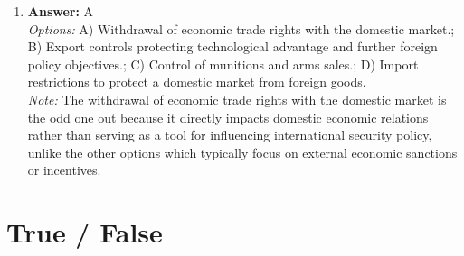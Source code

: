 \documentclass[12pt]{article}
\begin{document}
\begin{enumerate}[label=\arabic*.]
\item \textbf{Answer:} A
\\ \textit{Options:} A) Withdrawal of economic trade rights with the domestic market.; B) Export controls protecting technological advantage and further foreign policy objectives.; C) Control of munitions and arms sales.; D) Import restrictions to protect a domestic market from foreign goods.
\\ \textit{Note:} The withdrawal of economic trade rights with the domestic market is the odd one out because it directly impacts domestic economic relations rather than serving as a tool for influencing international security policy, unlike the other options which typically focus on external economic sanctions or incentives.
\end{enumerate}

\section*{True / False}
\end{document}
